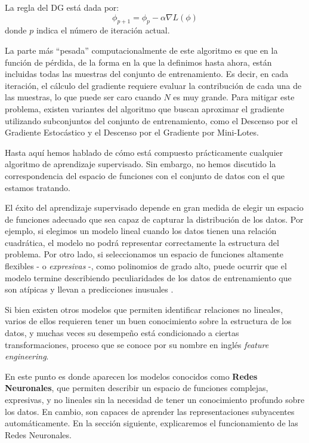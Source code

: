 \documentclass[../../main.tex]{subfiles}
\begin{document}
La regla del DG está dada por:
\[
\phi_{p+1} = \phi_{p} - \alpha \nabla L(\phi)
\]
donde \(p\) indica el número de iteración actual.

La parte más ``pesada'' computacionalmente de este algoritmo es que en la función de pérdida, de la forma en la que la definimos hasta ahora, están incluidas todas las muestras del conjunto de entrenamiento. Es decir, en cada iteración, el cálculo del gradiente requiere evaluar la contribución de cada una de las muestras, lo que puede ser caro cuando \(N\) es muy grande. Para mitigar este problema, existen variantes del algoritmo que buscan aproximar el gradiente utilizando subconjuntos del conjunto de entrenamiento, como el Descenso por el Gradiente Estocástico y el Descenso por el Gradiente por Mini-Lotes.


\bigskip
Hasta aquí hemos hablado de cómo está compuesto prácticamente cualquier algoritmo de aprendizaje supervisado. Sin embargo, no hemos discutido la correspondencia del espacio de funciones con el conjunto de datos con el que estamos tratando. 

El éxito del aprendizaje supervisado depende en gran medida de elegir un espacio de funciones adecuado que sea capaz de capturar la distribución de los datos. Por ejemplo, si elegimos un modelo lineal cuando los datos tienen una relación cuadrática, el modelo no podrá representar correctamente la estructura del problema. Por otro lado, si seleccionamos un espacio de funciones altamente flexibles - o \textit{expresivas} -, como polinomios de grado alto, puede ocurrir que el modelo termine describiendo peculiaridades de los datos de entrenamiento que son atípicas y llevan a predicciones inusuales \cite{prince2024understanding}.

Si bien existen otros modelos que permiten identificar relaciones no lineales, varios de ellos requieren tener un buen conocimiento sobre la estructura de los datos, y muchas veces su desempeño está condicionado a ciertas transformaciones, proceso que se conoce por su nombre en inglés \textit{feature engineering}.

En este punto es donde aparecen los modelos conocidos como \textbf{Redes Neuronales}, que permiten describir un espacio de funciones complejas, expresivas, y no lineales sin la necesidad de tener un conocimiento profundo sobre los datos. En cambio, son capaces de aprender las representaciones subyacentes automáticamente. En la sección siguiente, explicaremos el funcionamiento de las Redes Neuronales.
\end{document}
